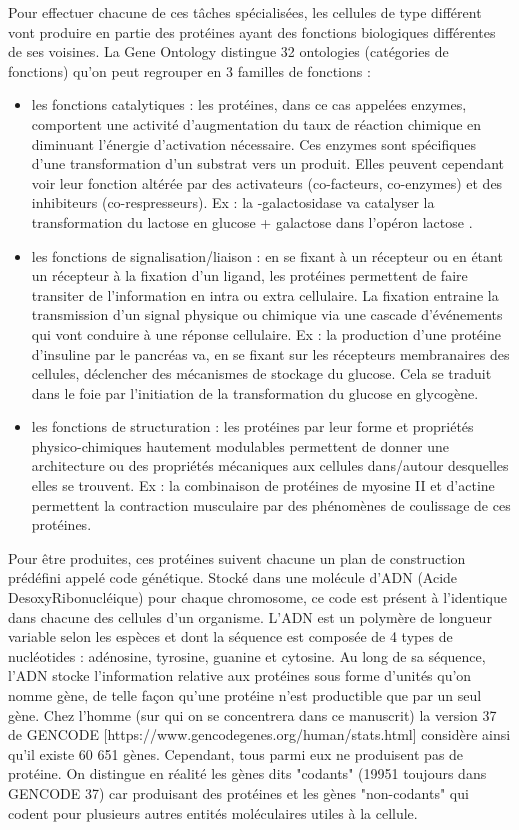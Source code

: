 Pour effectuer chacune de ces tâches spécialisées, les cellules de type différent vont produire en partie des protéines ayant des fonctions biologiques différentes de ses voisines. La Gene Ontology distingue 32 ontologies (catégories de fonctions) qu'on peut regrouper en 3 familles de fonctions \cite{Mathews2012}: 
\begin{itemize}
    \item les fonctions catalytiques : les protéines, dans ce cas appelées enzymes, comportent une activité d'augmentation du taux de réaction chimique en diminuant l'énergie d'activation nécessaire. Ces enzymes sont spécifiques d'une transformation d'un substrat vers un produit. Elles peuvent cependant voir leur fonction altérée par des activateurs (co-facteurs, co-enzymes) et des inhibiteurs (co-respresseurs). Ex : la \textbeta-galactosidase va catalyser la transformation du lactose en glucose + galactose dans l'opéron lactose \cite{Jacob1961Jun}.
    \item les fonctions de signalisation/liaison : en se fixant à un récepteur ou en étant un récepteur à la fixation d'un ligand, les protéines permettent de faire transiter de l'information en intra ou extra cellulaire. La fixation entraine la transmission d'un signal physique ou chimique via une cascade d'événements qui vont conduire à une réponse cellulaire. Ex : la production d'une protéine d'insuline par le pancréas va, en se fixant sur les récepteurs membranaires des cellules, déclencher des mécanismes de stockage du glucose. Cela se traduit dans le foie par l'initiation de la transformation du glucose en glycogène.
    \item les fonctions de structuration : les protéines par leur forme et propriétés physico-chimiques hautement modulables permettent de donner une architecture ou des propriétés mécaniques aux cellules dans/autour desquelles elles se trouvent. Ex : la combinaison de protéines de myosine II et d'actine permettent la contraction musculaire par des phénomènes de coulissage de ces protéines.
\end{itemize}


Pour être produites, ces protéines suivent chacune un plan de construction prédéfini appelé code génétique. Stocké dans une molécule d'ADN (Acide DesoxyRibonucléique) pour chaque chromosome, ce code est présent à l'identique dans chacune des cellules d'un organisme. L'ADN est un polymère de longueur variable selon les espèces et dont la séquence est composée de 4 types de nucléotides : adénosine, tyrosine, guanine et cytosine. Au long de sa séquence, l'ADN stocke l'information relative aux protéines sous forme d'unités qu'on nomme gène, de telle façon qu'une protéine n'est productible que par un seul gène. Chez l'homme (sur qui on se concentrera dans ce manuscrit) la version 37 de GENCODE [https://www.gencodegenes.org/human/stats.html] considère ainsi qu'il existe 60 651 gènes. Cependant, tous parmi eux ne produisent pas de protéine. On distingue en réalité les gènes dits "codants" (19951 toujours dans GENCODE 37) car produisant des protéines et les gènes "non-codants" qui codent pour plusieurs autres entités moléculaires utiles à la cellule.

